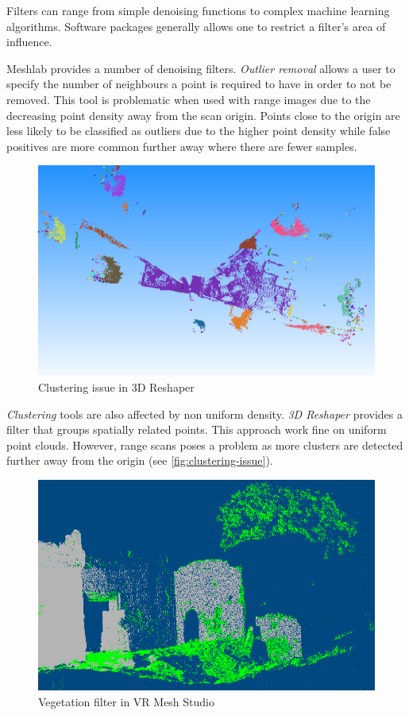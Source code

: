 Filters can range from simple denoising functions to complex machine learning algorithms. Software packages generally allows one to restrict a filter's area of influence.

Meshlab provides a number of denoising filters. \emph{Outlier removal} allows a user to specify the number of neighbours a point is required to have in order to not be removed. This tool is problematic when used with range images due to the decreasing point density away from the scan origin. Points close to the origin are less likely to be classified as outliers due to the higher point density while false positives are more common further away where there are fewer samples.

\begin{figure}[ht]
  \centreing
  \includegraphics[width=1\linewidth]{images/clustering}
  \caption{Clustering issue in 3D Reshaper \cite{Technodigit2012}}
  \label{fig:clustering-issue}
\end{figure}

\emph{Clustering} tools are also affected by non uniform density. \emph{3D Reshaper} \cite{Technodigit2012} provides a filter that groups spatially related points. This approach work fine on uniform point clouds. However, range scans poses a problem as more clusters are detected further away from the origin (see \autoref{fig:clustering-issue}).

\begin{figure}[ht]
  \centreing
  \includegraphics[width=1\linewidth]{images/vrmesh-veg}
  \caption{Vegetation filter in VR Mesh Studio \cite{VirtualGrid2012}}
  \label{fig:vegetation-issue}
\end{figure}


